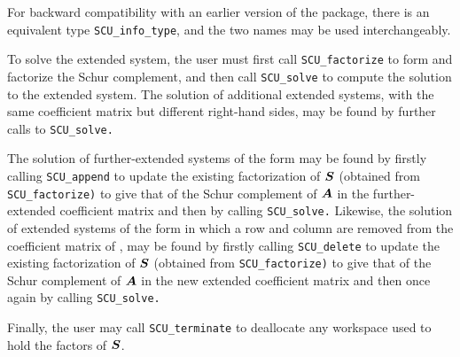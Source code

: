 \documentclass{galahad}
\newcommand{\packagename}{SCU}
\begin{document}
\noindent
For backward compatibility with an earlier version of the package, there
is an equivalent type {\tt \packagename\_info\_type}, and the two names
may be used interchangeably.


\galarguments
To solve the extended system, 
the user must first call {\tt \packagename\_factorize} to form and factorize 
the Schur complement, 
and then call {\tt \packagename\_solve} to compute the solution to the extended 
system. The solution of additional extended systems, with the 
same coefficient matrix but different right-hand sides, may 
be found by further calls to 
{\tt \packagename\_solve.} 

The solution of further-extended systems of the form 
may be found by firstly calling {\tt \packagename\_append} to update the 
existing factorization of ${\bm{S}}$ 
(obtained from {\tt \packagename\_factorize)} to give that of 
the Schur complement of $ {\bm{A}}$ 
in the further-extended coefficient matrix and then by calling 
{\tt \packagename\_solve.} 
Likewise, the solution of extended systems of the form 
in which a row and column are removed from the 
coefficient matrix of , 
may be found by firstly calling {\tt \packagename\_delete} to update the 
existing factorization of ${\bm{S}}$ 
(obtained from {\tt \packagename\_factorize)} to give that of 
the Schur complement of $ {\bm{A}}$ 
in the new extended coefficient matrix and then once again by calling 
{\tt \packagename\_solve.} 

Finally, the user may call {\tt \packagename\_terminate} 
to deallocate any workspace used to hold the factors of ${\bm{S}}$. 
\end{document}
